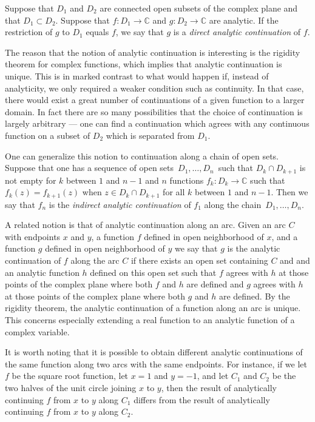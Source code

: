 \documentclass[12pt]{article}
\begin{document}

Suppose that $D_1$ and $D_2$ are connected open subsets of the complex plane 
and that $D_1 \subset D_2$.  Suppose that $f \colon D_1 \to \mathbb{C}$ and $g \colon D_2 \to \mathbb{C}$ are analytic.  If the restriction of $g$ to $D_1$ equals $f$, we say that $g$ is a \emph{direct analytic continuation} of $f$.

The reason that the notion of analytic continuation is interesting is the rigidity theorem for complex functions, which implies that analytic continuation is unique.  This is in marked contrast to what would happen if, instead of analyticity, we only required a weaker condition such as continuity.  In that case, there would exist a great number of continuations of a given function to a larger domain.  In fact there are so many possibilities that the choice of continuation is largely arbitrary --- one can find a continuation which agrees with any continuous function on a subset of $D_2$ which is separated from $D_1$.

One can generalize this notion to continuation along a chain of open sets.
Suppose that one has a sequence of open sets\, 
$D_1,\ldots,D_n$\,  such that
$D_k \cap D_{k+1}$ is not empty for $k$ between $1$ and $n-1$ and $n$ functions
$f_k \colon D_k \to \mathbb{C}$ such that $f_k (z) = f_{k+1} (z)$ when 
$z \in D_k \cap D_{k+1}$ for all $k$ between $1$ and $n-1$.  Then we say
that $f_n$ is the \emph{indirect analytic continuation} of 
$f_1$ along the chain\, $D_1,\ldots,D_n$.

A related notion is that of analytic continuation along an arc.  Given an arc $C$ with endpoints $x$ and $y$, a function $f$ defined in open neighborhood of $x$, and a function $g$ defined in open neighborhood of $y$ we say that $g$ is the analytic continuation of $f$ along the arc $C$ if there exists an open set containing $C$ and and an analytic function $h$ defined on this open set such that $f$ agrees with $h$ at those points of the complex plane where both $f$ and $h$ are defined and $g$ agrees with $h$ at those points of the complex plane where both $g$ and $h$ are defined.  By the rigidity theorem, the analytic continuation of a function along an arc is unique.\, This concerns especially extending a real function to an analytic function of a complex variable.

It is worth noting that it is possible to obtain different analytic continuations of the same function along two arcs with the same endpoints.  For instance, if we let $f$ be the square root function, let $x=1$ and $y=-1$, and let $C_1$ and $C_2$ be the two halves of the unit circle joining $x$ to $y$, then the result of analytically continuing $f$ from $x$ to $y$ along $C_1$ differs from the result of analytically continuing $f$ from $x$ to $y$ along $C_2$.
\end{document}
